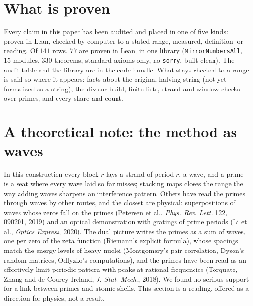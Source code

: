 \documentclass[11pt]{article}
\begin{document}
\section{What is proven}
Every claim in this paper has been audited and placed in one of five kinds: proven in Lean, checked by computer to a stated range, measured, definition, or reading. Of $141$ rows, $77$ are proven in Lean, in one library (\texttt{MirrorNumbersAll}, $15$ modules, $330$ theorems, standard axioms only, no \texttt{sorry}, built clean). The audit table and the library are in the code bundle. What stays checked to a range is said so where it appears: facts about the original halving string (not yet formalized as a string), the divisor build, finite lists, strand and window checks over primes, and every share and count.

\section{A theoretical note: the method as waves}
In this construction every block $r$ lays a strand of period $r$, a wave, and a prime is a seat where every wave laid so far misses; stacking maps closes the range the way adding waves sharpens an interference pattern. Others have read the primes through waves by other routes, and the closest are physical: superpositions of waves whose zeros fall on the primes (Petersen et al., \emph{Phys. Rev. Lett.} 122, 090201, 2019) and an optical demonstration with gratings of prime periods (Li et al., \emph{Optics Express}, 2020). The dual picture writes the primes as a sum of waves, one per zero of the zeta function (Riemann's explicit formula), whose spacings match the energy levels of heavy nuclei (Montgomery's pair correlation, Dyson's random matrices, Odlyzko's computations), and the primes have been read as an effectively limit-periodic pattern with peaks at rational frequencies (Torquato, Zhang and de Courcy-Ireland, \emph{J. Stat. Mech.}, 2018). We found no serious support for a link between primes and atomic shells. This section is a reading, offered as a direction for physics, not a result.
\end{document}

